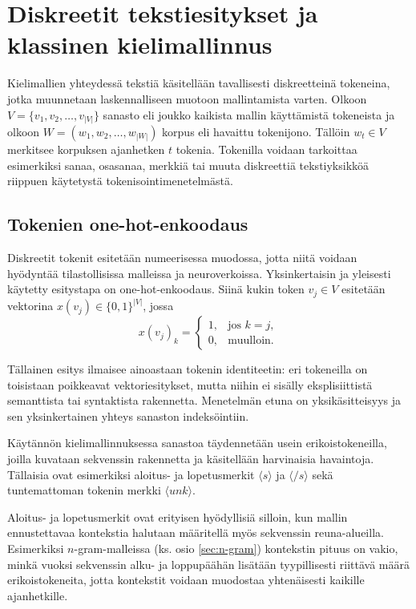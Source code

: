 \section{Diskreetit tekstiesitykset ja klassinen kielimallinnus}

Kielimallien yhteydessä tekstiä käsitellään tavallisesti diskreetteinä tokeneina,
jotka muunnetaan laskennalliseen muotoon mallintamista varten. Olkoon
\(V = \{v_1, v_2, \dots, v_{|V|}\}\) sanasto eli joukko kaikista mallin
käyttämistä tokeneista ja olkoon
\(W = (w_1, w_2, \dots, w_{|W|})\) korpus eli havaittu tokenijono. Tällöin
\(w_t \in V\) merkitsee korpuksen ajanhetken \(t\) tokenia. Tokenilla voidaan
tarkoittaa esimerkiksi sanaa, osasanaa, merkkiä tai muuta diskreettiä
tekstiyksikköä riippuen käytetystä tokenisointimenetelmästä.

\subsection{Tokenien one-hot-enkoodaus}

Diskreetit tokenit esitetään numeerisessa muodossa, jotta niitä voidaan hyödyntää
tilastollisissa malleissa ja neuroverkoissa. Yksinkertaisin ja yleisesti käytetty
esitystapa on one-hot-enkoodaus. Siinä kukin token \(v_j \in V\) esitetään
vektorina \(x(v_j) \in \{0,1\}^{|V|}\), jossa
\[
  x(v_j)_k =
  \begin{cases}
    1, & \text{jos } k = j, \\
    0, & \text{muulloin}.
  \end{cases}
\]

Tällainen esitys ilmaisee ainoastaan tokenin identiteetin: eri tokeneilla on
toisistaan poikkeavat vektoriesitykset, mutta niihin ei sisälly eksplisiittistä
semanttista tai syntaktista rakennetta. Menetelmän etuna on yksikäsitteisyys ja
sen yksinkertainen yhteys sanaston indeksöintiin.

Käytännön kielimallinnuksessa sanastoa täydennetään usein erikoistokeneilla,
joilla kuvataan sekvenssin rakennetta ja käsitellään harvinaisia havaintoja.
Tällaisia ovat esimerkiksi aloitus- ja lopetusmerkit \(\langle s \rangle\) ja
\(\langle /s \rangle\) sekä tuntemattoman tokenin merkki \(\langle unk \rangle\).

Aloitus- ja lopetusmerkit ovat erityisen hyödyllisiä silloin, kun mallin
ennustettavaa kontekstia halutaan määritellä myös sekvenssin reuna-alueilla.
Esimerkiksi \(n\)-gram-malleissa (ks. osio \ref{sec:n-gram}) kontekstin pituus on
vakio, minkä vuoksi sekvenssin alku- ja loppupäähän lisätään tyypillisesti
riittävä määrä erikoistokeneita, jotta kontekstit voidaan muodostaa yhtenäisesti
kaikille ajanhetkille.


